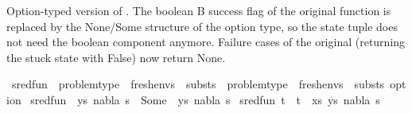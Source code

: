 %
\begin{isabellebody}%
%
%
\isadelimtheory
%
\endisadelimtheory
%
\isatagtheory
%
\endisatagtheory
{\isafoldtheory}%
%
\isadelimtheory
%
\endisadelimtheory
%
\isadelimdocument
%
\endisadelimdocument
%
\isatagdocument
%
\isamarkuptrue%
%
\endisatagdocument
{\isafolddocument}%
%
\isadelimdocument
%
\endisadelimdocument
%
\begin{isamarkuptext}%
Option-typed version of . The boolean B success flag of the
original function is replaced by the None/Some structure of the option type,
so the state tuple does not need the boolean component anymore. Failure cases
of the original (returning the stuck state with False) now return None.%
\end{isamarkuptext}\isamarkuptrue%
\isamarkupfalse%
\ sred{\isacharunderscore}{\kern0pt}fun\ {\isacharcolon}{\kern0pt}{\isacharcolon}{\kern0pt}\ {\isachardoublequoteopen}{\isacharparenleft}{\kern0pt}problem{\isacharunderscore}{\kern0pt}type\ {\isasymtimes}\ fresh{\isacharunderscore}{\kern0pt}envs\ {\isasymtimes}\ substs{\isacharparenright}{\kern0pt}\ {\isasymRightarrow}\ {\isacharparenleft}{\kern0pt}problem{\isacharunderscore}{\kern0pt}type\ {\isasymtimes}\ fresh{\isacharunderscore}{\kern0pt}envs\ {\isasymtimes}\ substs{\isacharparenright}{\kern0pt}\ option{\isachardoublequoteclose}\ \isanewline
{\isachardoublequoteopen}sred{\isacharunderscore}{\kern0pt}fun\ {\isacharparenleft}{\kern0pt}{\isacharparenleft}{\kern0pt}{\isacharbrackleft}{\kern0pt}{\isacharbrackright}{\kern0pt}{\isacharcomma}{\kern0pt}\ ys{\isacharparenright}{\kern0pt}{\isacharcomma}{\kern0pt}\ nabla{\isacharcomma}{\kern0pt}\ s{\isacharparenright}{\kern0pt}\ {\isacharequal}{\kern0pt}\ Some\ {\isacharparenleft}{\kern0pt}{\isacharparenleft}{\kern0pt}{\isacharbrackleft}{\kern0pt}{\isacharbrackright}{\kern0pt}{\isacharcomma}{\kern0pt}\ ys{\isacharparenright}{\kern0pt}{\isacharcomma}{\kern0pt}\ nabla{\isacharcomma}{\kern0pt}\ s{\isacharparenright}{\kern0pt}{\isachardoublequoteclose}\ {\isacharbar}{\kern0pt}\isanewline
{\isachardoublequoteopen}sred{\isacharunderscore}{\kern0pt}fun\ {\isacharparenleft}{\kern0pt}{\isacharparenleft}{\kern0pt}{\isacharparenleft}{\kern0pt}t{}\ {\isasymapprox}{\isacharquery}{\kern0pt}\ t{}{\isacharparenright}{\kern0pt}\ {\isacharhash}{\kern0pt}\ xs{\isacharcomma}{\kern0pt}\ ys{\isacharparenright}{\kern0pt}{\isacharcomma}{\kern0pt}\ nabla{\isacharcomma}{\kern0pt}\ s{\isacharparenright}{\kern0pt}\ {\isacharequal}{\kern0pt}\isanewline

\end{isabellebody}
